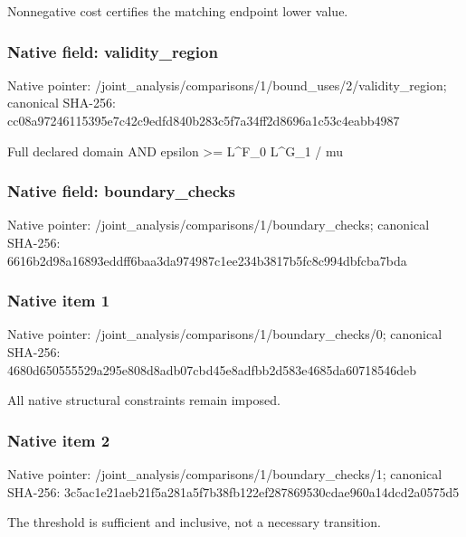 \documentclass[10pt,a4paper]{article}
\begin{document}
\begingroup\raggedright\sloppy Nonnegative cost certifies the matching endpoint lower value.\par\endgroup

\subsubsection{Native field: validity\_\allowbreak{}region}
Native pointer: /joint\_\allowbreak{}analysis/comparisons/1/bound\_\allowbreak{}uses/2/validity\_\allowbreak{}region; canonical SHA-256: cc08a97246115395e7c42c9edfd840b283c5f7a34ff2d8696a1c53c4eabb4987

\begingroup\raggedright\sloppy Full declared domain AND epsilon >=\allowbreak{} L\textasciicircum{}F\_\allowbreak{}0 L\textasciicircum{}G\_\allowbreak{}1 /\allowbreak{} mu\par\endgroup

\subsubsection{Native field: boundary\_\allowbreak{}checks}
Native pointer: /joint\_\allowbreak{}analysis/comparisons/1/boundary\_\allowbreak{}checks; canonical SHA-256: 6616b2d98a16893eddff6baa3da974987c1ee234b3817b5fc8c994dbfcba7bda

\subsubsection{Native item 1}
Native pointer: /joint\_\allowbreak{}analysis/comparisons/1/boundary\_\allowbreak{}checks/0; canonical SHA-256: 4680d650555529a295e808d8adb07cbd45e8adfbb2d583e4685da60718546deb

\begingroup\raggedright\sloppy All native structural constraints remain imposed.\par\endgroup

\subsubsection{Native item 2}
Native pointer: /joint\_\allowbreak{}analysis/comparisons/1/boundary\_\allowbreak{}checks/1; canonical SHA-256: 3c5ac1e21aeb21f5a281a5f7b38fb122ef287869530cdae960a14dcd2a0575d5

\begingroup\raggedright\sloppy The threshold is sufficient and inclusive,\allowbreak{} not a necessary transition.\par\endgroup
\end{document}
